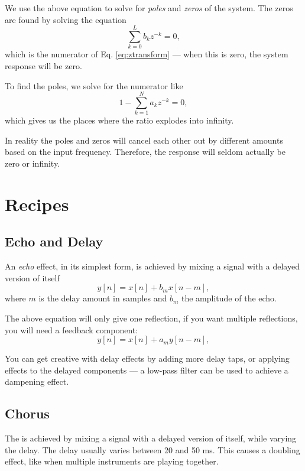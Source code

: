 \documentclass{article}
\def\lsqb{\left[}
\def\rsqb{\right]}
\def\sqb#1{\lsqb #1 \rsqb}
\def\ysig{y\sqb{n}}
\begin{document}
We use the above equation to solve for \textit{poles} and \textit{zeros} of the system. The zeros are found by solving the equation
\begin{equation}
    \sum_{k=0}^L b_k z^{-k} = 0,
\end{equation}
which is the numerator of Eq. \ref{eq:ztransform} --- when this is zero, the system response will be zero.

To find the poles, we solve for the numerator like
\begin{equation}
    1 - \sum_{k=1}^N a_k z^{-k} = 0,
\end{equation}
which gives us the places where the ratio explodes into infinity.

In reality the poles and zeros will cancel each other out by different amounts based on the input frequency. Therefore, the response will seldom actually be zero or infinity.

\section{Recipes}
\subsection{Echo and Delay}
An \textit{echo} effect, in its simplest form, is achieved by mixing a signal with a delayed version of itself
\begin{equation}
	\ysig = x\sqb{n} + b_m x\sqb{n - m},
\end{equation}
where $m$ is the delay amount in samples and $b_m$ the amplitude of the echo.

The above equation will only give one reflection, if you want multiple reflections, you will need a feedback component:
\begin{equation}
	\ysig = x\sqb{n} + a_m y\sqb{n - m},
\end{equation}

You can get creative with delay effects by adding more delay taps, or applying effects to the delayed components --- a low-pass filter can be used to achieve a dampening effect.

\subsection{Chorus}
The  is achieved by mixing a signal with a delayed version of itself, while varying the delay. The delay usually varies between 20 and 50 ms. This causes a doubling effect, like when multiple instruments are playing together.
\end{document}
